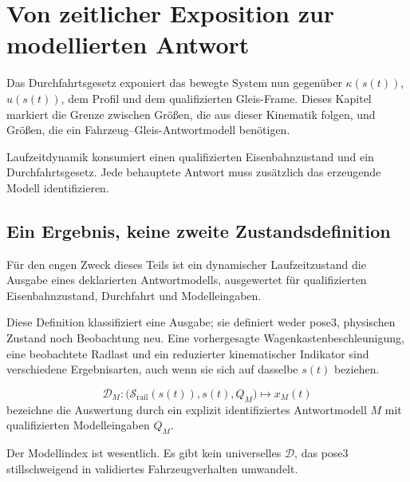 \chapter{Von zeitlicher Exposition zur modellierten Antwort}
\label{chap:runtime-dynamics}

Das Durchfahrtsgesetz exponiert das bewegte System nun gegenüber
\(\kappa(s(t))\), \(u(s(t))\), dem Profil und dem qualifizierten Gleis-Frame.
Dieses Kapitel markiert die Grenze zwischen Größen, die aus dieser Kinematik
folgen, und Größen, die ein Fahrzeug--Gleis-Antwortmodell benötigen.

\begin{principle}[Laufzeitdynamikprinzip]
\label{princ:runtime-dynamics}
Laufzeitdynamik konsumiert einen qualifizierten Eisenbahnzustand und ein
Durchfahrtsgesetz. Jede behauptete Antwort muss zusätzlich das erzeugende
Modell identifizieren.
\end{principle}

\section{Ein Ergebnis, keine zweite Zustandsdefinition}

\begin{definition}
\label{def:runtime-dynamic-state}
Für den engen Zweck dieses Teils ist ein dynamischer Laufzeitzustand die
Ausgabe eines deklarierten Antwortmodells, ausgewertet für qualifizierten
Eisenbahnzustand, Durchfahrt und Modelleingaben.
\end{definition}

Diese Definition klassifiziert eine Ausgabe; sie definiert weder pose3,
physischen Zustand noch Beobachtung neu. Eine vorhergesagte
Wagenkastenbeschleunigung, eine beobachtete Radlast und ein reduzierter
kinematischer Indikator sind verschiedene Ergebnisarten, auch wenn sie sich
auf dasselbe \(s(t)\) beziehen.

\begin{definition}[Laufzeitdynamikoperator]
\label{def:runtime-dynamics-operator}
\[
\mathcal D_M:
\bigl(\mathcal S_{\mathrm{rail}}(s(t)),s(t),Q_M\bigr)
\longmapsto x_M(t)
\]
bezeichne die Auswertung durch ein explizit identifiziertes Antwortmodell
\(M\) mit qualifizierten Modelleingaben \(Q_M\).
\end{definition}

Der Modellindex ist wesentlich. Es gibt kein universelles \(\mathcal D\), das
pose3 stillschweigend in validiertes Fahrzeugverhalten umwandelt.

